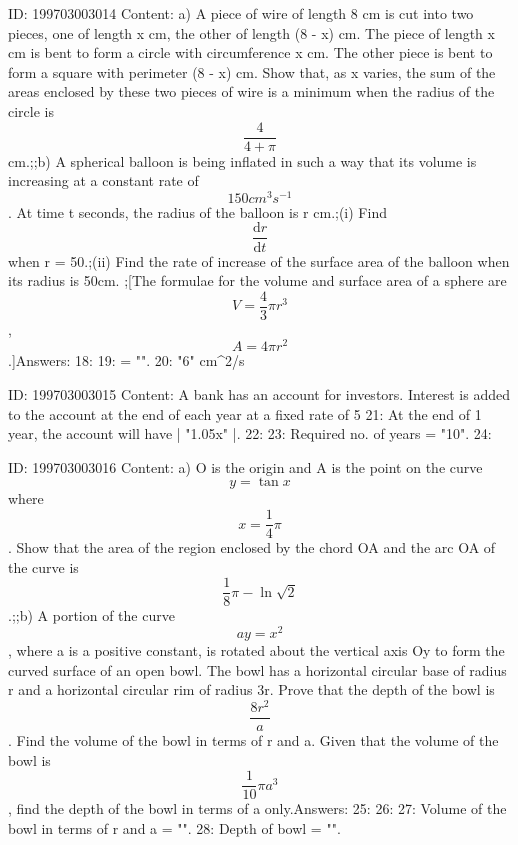 \documentclass{article}
\begin{document}
ID: 199703003014
Content:
a) A piece of wire of length 8 cm is cut into two pieces, one of length x cm, the other of length (8 - x) cm. The piece of length x cm is bent to form a circle with circumference x cm. The other piece is bent to form a square with perimeter (8 - x) cm. Show that, as x varies, the sum of the areas enclosed by these two pieces of wire is a minimum when the radius of the circle is \[\frac{4}{4 + \pi}\] cm.;;b) A spherical balloon is being inflated in such a way that its volume is increasing at a constant rate of \[150cm^{3}s^{-1}\]. At time t seconds, the radius of the balloon is r cm.;(i) Find \[\frac{\mathrm{d} r}{\mathrm{d} t}\] when r = 50.;(ii) Find the rate of increase of the surface area of the balloon when its radius is 50cm. ;[The formulae for the volume and surface area of a sphere are \[V = \frac{4}{3}\pi r^{3}\], \[A = 4\pi r^{2}\].]Answers:
18: 
19:  = "".
20: "6" cm^2/s

ID: 199703003015
Content:
A bank has an account for investors. Interest is added to the account at the end of each year at a fixed rate of 5%
21: At the end of 1 year, the account will have | "1.05x" |.
22: 
23: Required no. of years = "10".
24: 

ID: 199703003016
Content:
a) O is the origin and A is the point on the curve \[y = \tan x\] where \[x = \frac {1}{4} \pi\]. Show that the area of the region enclosed by the chord OA and the arc OA of the curve is \[\frac {1}{8} \pi - \ln \sqrt{2}\].;;b) A portion of the curve \[ay = x^{2}\], where a is a positive constant, is rotated about the vertical axis Oy to form the curved surface of an open bowl. The bowl has a horizontal circular base of radius r and a horizontal circular rim of radius 3r. Prove that the depth of the bowl is \[\frac {8r^{2}}{a}\].  Find the volume of the bowl in terms of r and a. Given that the volume of the bowl is \[\frac {1}{10} \pi a^{3}\], find the depth of the bowl in terms of a only.Answers:
25: 
26: 
27: Volume of the bowl in terms of r and a = "".
28: Depth of bowl = "".
\end{document}
